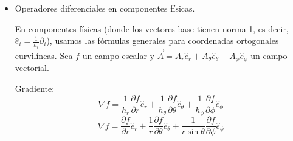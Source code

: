 \documentclass[11pt,spanish]{article}
\begin{document}
\begin{itemize}
Ahora, calculamos sistemáticamente los símbolos no nulos (recordando la simetría $\Gamma^k_{ij} = \Gamma^k_{ji}$):
\begin{itemize}
\item Para $k = r$:
\begin{itemize}
\item $\Gamma^r_{\theta\theta} = -\frac{1}{2g_{rr}} \partial_r g_{\theta\theta} = -\frac{1}{2(1)} (2r) = -r$
\item $\Gamma^r_{\phi\phi} = -\frac{1}{2g_{rr}} \partial_r g_{\phi\phi} = -\frac{1}{2(1)} (2r\sin^2\theta) = -r\sin^2\theta$
\end{itemize}
\item Para $k = \theta$:
\begin{itemize}
\item $\Gamma^\theta_{r\theta} = \Gamma^\theta_{\theta r} = \frac{1}{2g_{\theta\theta}} \partial_r g_{\theta\theta} = \frac{1}{2r^2} (2r) = \frac{1}{r}$
\item $\Gamma^\theta_{\phi\phi} = -\frac{1}{2g_{\theta\theta}} \partial_\theta g_{\phi\phi} = -\frac{1}{2r^2} (2r^2\sin\theta\cos\theta) = -\sin\theta\cos\theta$
\end{itemize}    
\item Para $k = \phi$:
\begin{itemize}
\item $\Gamma^\phi_{r\phi} = \Gamma^\phi_{\phi r} = \frac{1}{2g_{\phi\phi}} \partial_r g_{\phi\phi} = \frac{1}{2r^2\sin^2\theta} (2r\sin^2\theta) = \frac{1}{r}$
\item $\Gamma^\phi_{\theta\phi} = \Gamma^\phi_{\phi\theta} = \frac{1}{2g_{\phi\phi}} \partial_\theta g_{\phi\phi} = \frac{1}{2r^2\sin^2\theta} (2r^2\sin\theta\cos\theta) = \frac{\cos\theta}{\sin\theta} = \cot\theta$
\end{itemize}
\end{itemize}

Todos los demás símbolos de Christoffel son cero.

\item Operadores diferenciales en componentes físicas.

En componentes físicas (donde los vectores base tienen norma 1, es decir, $\hat{e}_i = \frac{1}{h_i}\partial_i$), usamos las fórmulas generales para coordenadas ortogonales curvilíneas. 
Sea $f$ un campo escalar y $\vec{A} = A_r\hat{e}_r + A_\theta\hat{e}_\theta + A_\phi\hat{e}_\phi$ un campo vectorial.

Gradiente:
$$
\nabla f = \frac{1}{h_r} \frac{\partial f}{\partial r} \hat{e}_r + \frac{1}{h_\theta} \frac{\partial f}{\partial \theta} \hat{e}_\theta + \frac{1}{h_\phi} \frac{\partial f}{\partial \phi} \hat{e}_\phi
$$
$$
\nabla f = \frac{\partial f}{\partial r} \hat{e}_r + \frac{1}{r} \frac{\partial f}{\partial \theta} \hat{e}_\theta + \frac{1}{r\sin\theta} \frac{\partial f}{\partial \phi} \hat{e}_\phi
$$


\end{itemize}
\end{document}
